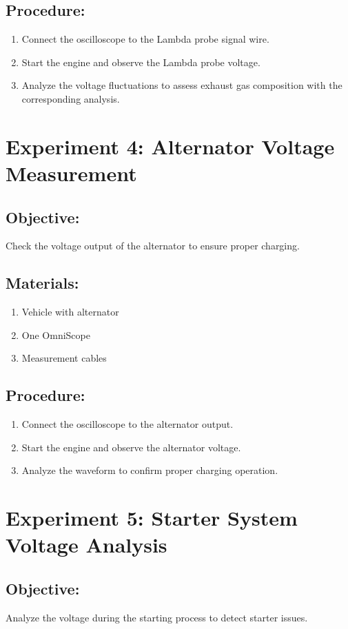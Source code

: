 \documentclass{scrreprt}
\begin{document}
\subsection*{Procedure:}
\begin{enumerate}
    \item Connect the oscilloscope to the Lambda probe signal wire.
    \item Start the engine and observe the Lambda probe voltage.
    \item Analyze the voltage fluctuations to assess exhaust gas composition with the corresponding analysis.
\end{enumerate}

\section*{Experiment 4: Alternator Voltage Measurement}
\subsection*{Objective:} Check the voltage output of the alternator to ensure proper charging.
\subsection*{Materials:}
\begin{enumerate}
    \item Vehicle with alternator
    \item One OmniScope
    \item Measurement cables
\end{enumerate}
\subsection*{Procedure:}
\begin{enumerate}
    \item Connect the oscilloscope to the alternator output.
    \item Start the engine and observe the alternator voltage.
    \item Analyze the waveform to confirm proper charging operation.
\end{enumerate}

\section*{Experiment 5: Starter System Voltage Analysis}
\subsection*{Objective:} Analyze the voltage during the starting process to detect starter issues.
\end{document}
